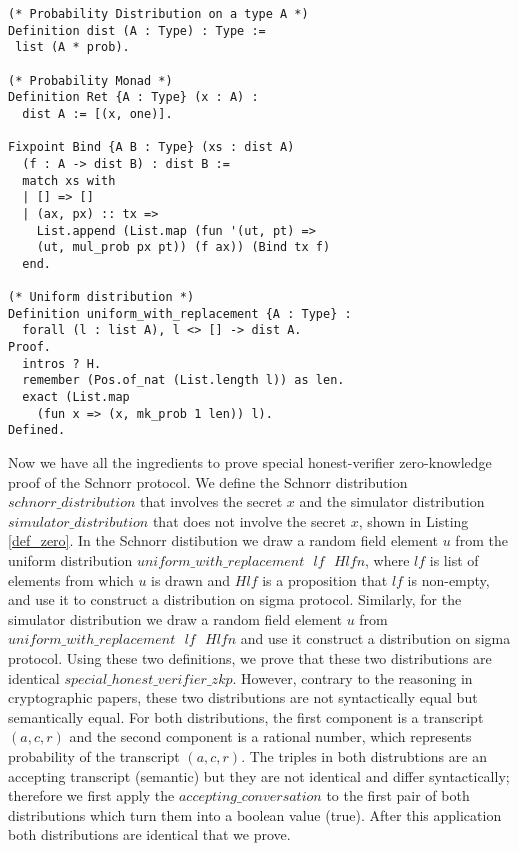 \documentclass[conference,compsoc]{IEEEtran}
\begin{document}
\begin{lstlisting}[frame=single, language=Coq, caption={Definition of Uniform Probability Distribution},
    label={prob_def},captionpos=t, basicstyle=\ttfamily\footnotesize,
    abovecaptionskip=-\medskipamount]
(* Probability Distribution on a type A *)
Definition dist (A : Type) : Type := 
 list (A * prob).
  
(* Probability Monad *)
Definition Ret {A : Type} (x : A) : 
  dist A := [(x, one)].

Fixpoint Bind {A B : Type} (xs : dist A)  
  (f : A -> dist B) : dist B := 
  match xs with 
  | [] => [] 
  | (ax, px) :: tx => 
    List.append (List.map (fun '(ut, pt) => 
    (ut, mul_prob px pt)) (f ax)) (Bind tx f)
  end.

(* Uniform distribution *)
Definition uniform_with_replacement {A : Type} : 
  forall (l : list A), l <> [] -> dist A.
Proof.
  intros ? H.
  remember (Pos.of_nat (List.length l)) as len.
  exact (List.map 
    (fun x => (x, mk_prob 1 len)) l).
Defined.
\end{lstlisting}

  
Now we have all the ingredients to prove special honest-verifier 
zero-knowledge proof of the Schnorr protocol. We define the 
Schnorr distribution $schnorr\_distribution$
that involves the secret $x$ and 
the simulator distribution $simulator\_distribution$
that does not involve the secret $x$, shown in Listing \ref{def_zero}. 
In the Schnorr distibution we draw 
a random field element $u$ from the uniform 
distribution $uniform\_with\_replacement \text{ }lf \text{ } Hlfn$,
where $lf$ is list of elements from which $u$
is drawn and $Hlf$ is a proposition that 
$lf$ is non-empty, and use it to construct 
a distribution on sigma protocol. Similarly, 
for the simulator distribution 
we draw a random field element $u$ from 
$uniform\_with\_replacement \text{ }lf \text{ } Hlfn$
and use it construct a distribution on sigma protocol. 
Using these two definitions, we prove that these two 
distributions are identical $special\_honest\_verifier\_zkp$. However, 
contrary to the reasoning in cryptographic papers, 
these two distributions are not syntactically equal but 
semantically equal. For both distributions, 
the first component is a transcript $(a, c, r)$ and 
the second component is a rational number, which represents probability of 
the transcript $(a, c, r)$. The triples in both distrubtions 
are an accepting transcript (semantic) but they 
are not identical and differ syntactically; 
therefore we first apply the 
$accepting\_conversation$ to the first pair of 
both distributions which turn them into 
a boolean value (true). After this  
application both distributions are identical 
that we prove. 
\end{document}
